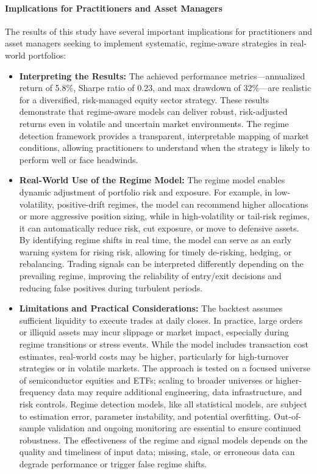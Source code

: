 \paragraph{Implications for Practitioners and Asset Managers}
The results of this study have several important implications for practitioners and asset managers seeking to implement systematic, regime-aware strategies in real-world portfolios:

\begin{itemize}
    \item \textbf{Interpreting the Results:} The achieved performance metrics---annualized return of 5.8\%, Sharpe ratio of 0.23, and max drawdown of 32\%---are realistic for a diversified, risk-managed equity sector strategy. These results demonstrate that regime-aware models can deliver robust, risk-adjusted returns even in volatile and uncertain market environments. The regime detection framework provides a transparent, interpretable mapping of market conditions, allowing practitioners to understand when the strategy is likely to perform well or face headwinds.
    \item \textbf{Real-World Use of the Regime Model:} The regime model enables dynamic adjustment of portfolio risk and exposure. For example, in low-volatility, positive-drift regimes, the model can recommend higher allocations or more aggressive position sizing, while in high-volatility or tail-risk regimes, it can automatically reduce risk, cut exposure, or move to defensive assets. By identifying regime shifts in real time, the model can serve as an early warning system for rising risk, allowing for timely de-risking, hedging, or rebalancing. Trading signals can be interpreted differently depending on the prevailing regime, improving the reliability of entry/exit decisions and reducing false positives during turbulent periods.
    \item \textbf{Limitations and Practical Considerations:} The backtest assumes sufficient liquidity to execute trades at daily closes. In practice, large orders or illiquid assets may incur slippage or market impact, especially during regime transitions or stress events. While the model includes transaction cost estimates, real-world costs may be higher, particularly for high-turnover strategies or in volatile markets. The approach is tested on a focused universe of semiconductor equities and ETFs; scaling to broader universes or higher-frequency data may require additional engineering, data infrastructure, and risk controls. Regime detection models, like all statistical models, are subject to estimation error, parameter instability, and potential overfitting. Out-of-sample validation and ongoing monitoring are essential to ensure continued robustness. The effectiveness of the regime and signal models depends on the quality and timeliness of input data; missing, stale, or erroneous data can degrade performance or trigger false regime shifts.
\end{itemize}

